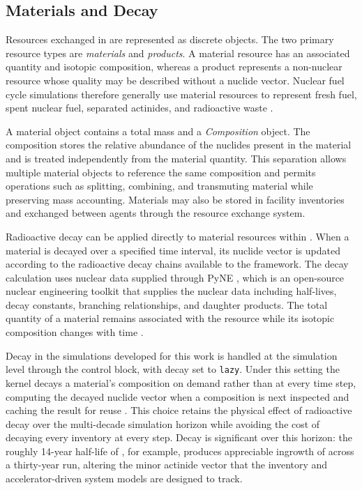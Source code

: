 \subsection{Materials and Decay}
\label{subsec:cyclus-materials-decay}


Resources exchanged in \Cyclus are represented as discrete objects. The two
primary resource types are \emph{materials} and \emph{products}. A material
resource has an associated quantity and isotopic composition, whereas a
product represents a non-nuclear resource whose quality may be described
without a nuclide vector. Nuclear fuel cycle simulations therefore generally
use material resources to represent fresh fuel, spent nuclear fuel, separated
actinides, and radioactive waste \cite{huff_fundamental_2016}.

A \Cyclus material object contains a total mass and a \emph{Composition}
object. The composition stores the relative abundance of the nuclides present
in the material and is treated independently from the material quantity.
This separation allows multiple material objects to reference the same
composition and permits operations such as splitting, combining, and
transmuting material while preserving mass accounting. Materials may also
be stored in facility inventories and exchanged between agents through the
resource exchange system.

Radioactive decay can be applied directly to material resources within
\Cyclus. When a material is decayed over a specified time interval, its
nuclide vector is updated according to the radioactive decay chains available
to the framework. The decay calculation uses nuclear data supplied through
PyNE \cite{scopatzPyNEPythonNuclear2012}, which is an open-source nuclear engineering toolkit
that supplies the nuclear data including half-lives, decay constants, branching relationships, and
daughter products. The total quantity of a material remains associated with
the resource while its isotopic composition changes with time
\cite{huff_fundamental_2016}.

Decay in the simulations developed for this work is handled at the
simulation level through the \Cyclus control block, with decay set to
\texttt{lazy}. Under this setting the kernel decays a material's composition
on demand rather than at every time step, computing the decayed nuclide
vector when a composition is next inspected and caching the result for reuse
\cite{huff_fundamental_2016}. This choice retains the physical effect of
radioactive decay over the multi-decade simulation horizon while avoiding
the cost of decaying every inventory at every step. Decay is significant
over this horizon: the roughly 14-year half-life of , for
example, produces appreciable ingrowth of  across a
thirty-year run, altering the minor actinide vector that the inventory and
accelerator-driven system models are designed to track.


